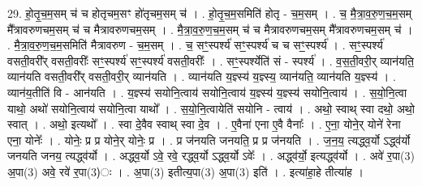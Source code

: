 \documentclass[17pt]{extarticle}
\begin{document}
29. हो॒तृ॒च॒म॒सम् च॑ च होतृचम॒सꣳ हो॑तृचम॒सम् च॑ । . हो॒तृ॒च॒म॒समिति॑ होतृ - च॒म॒सम् । . च॒ मै॒त्रा॒व॒रु॒ण॒च॒म॒सम् मै᳚त्रावरुणचम॒सम् च॑ च मैत्रावरुणचम॒सम् । . मै॒त्रा॒व॒रु॒ण॒च॒म॒सम् च॑ च मैत्रावरुणचम॒सम् मै᳚त्रावरुणचम॒सम् च॑ । . मै॒त्रा॒व॒रु॒ण॒च॒म॒समिति॑ मैत्रावरुण - च॒म॒सम् । . च॒ सꣳ॒॒स्पर्श्य॑ सꣳ॒॒स्पर्श्य॑ च च सꣳ॒॒स्पर्श्य॑ । . सꣳ॒॒स्पर्श्य॑ वसती॒वरी᳚र् वसती॒वरीः᳚ सꣳ॒॒स्पर्श्य॑ सꣳ॒॒स्पर्श्य॑ वसती॒वरीः᳚ । . सꣳ॒॒स्पर्श्येति॑ सं - स्पर्श्य॑ । . व॒स॒ती॒वरी॒र् व्यान॑यति॒ व्यान॑यति वसती॒वरी᳚र् वसती॒वरी॒र् व्यान॑यति । . व्यान॑यति य॒ज्ञ्स्य॑ य॒ज्ञ्स्य॒ व्यान॑यति॒ व्यान॑यति य॒ज्ञ्स्य॑ । . व्यान॑य॒तीति॑ वि - आन॑यति । . य॒ज्ञ्स्य॑ सयोनि॒त्वाय॑ सयोनि॒त्वाय॑ य॒ज्ञ्स्य॑ य॒ज्ञ्स्य॑ सयोनि॒त्वाय॑ । . स॒यो॒नि॒त्वा याथो॒ अथो॑ सयोनि॒त्वाय॑ सयोनि॒त्वा याथो᳚ । . स॒यो॒नि॒त्वायेति॑ सयोनि - त्वाय॑ । . अथो॒ स्वाथ् स्वा दथो॒ अथो॒ स्वात् । . अथो॒ इत्यथो᳚ । . स्वा दे॒वैव स्वाथ् स्वा दे॒व । . ए॒वैना॑ एना ए॒वै वैनाः᳚ । . ए॒ना॒ योने॒र् योने॑ रेना एना॒ योनेः᳚ । . योनेः॒ प्र प्र योने॒र् योनेः॒ प्र । . प्र ज॑नयति जनयति॒ प्र प्र ज॑नयति । . ज॒न॒य॒ त्यद्ध्व॒र्यो ऽद्ध्व॑र्यो जनयति जनय॒ त्यद्ध्व॑र्यो । . अद्ध्व॒र्यो ऽवे॒ रवे॒ रद्ध्व॒र्यो ऽद्ध्व॒र्यो ऽवेः᳚ । . अद्ध्व॑र्यो॒ इत्यद्ध्व॑र्यो । . अवे॑ र॒पा(3) अ॒पा(3) अवे॒ रवे॑ र॒पा(3)ः । . अ॒पा(3) इतीत्य॒पा(3) अ॒पा(3) इति॑ । . इत्या॑हा॒हे तीत्या॑ह । \newline
\end{document}
